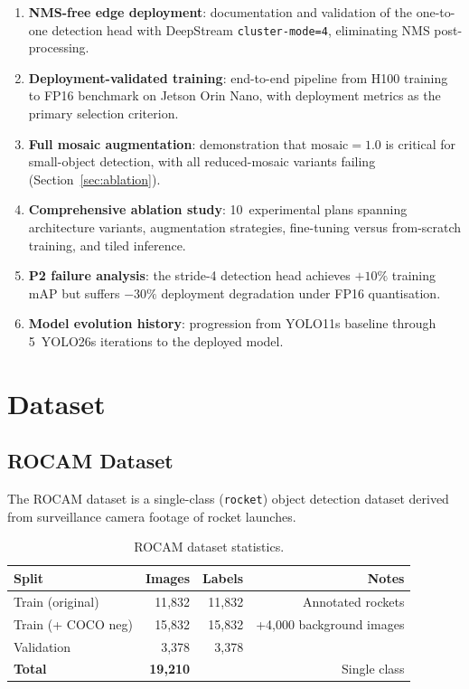 \documentclass[12pt, titlepage]{article}
\begin{document}
\begin{enumerate}[leftmargin=*]
  \item \textbf{NMS-free edge deployment}: documentation and validation
        of the one-to-one detection head with DeepStream
        \texttt{cluster-mode=4}, eliminating NMS post-processing.
  \item \textbf{Deployment-validated training}: end-to-end pipeline from
        H100 training to FP16 benchmark on Jetson Orin Nano, with
        deployment metrics as the primary selection criterion.
  \item \textbf{Full mosaic augmentation}: demonstration that
        $\text{mosaic} = 1.0$ is critical for small-object detection,
        with all reduced-mosaic variants failing (Section~\ref{sec:ablation}).
  \item \textbf{Comprehensive ablation study}: 10~experimental plans
        spanning architecture variants, augmentation strategies,
        fine-tuning versus from-scratch training, and tiled inference.
  \item \textbf{P2 failure analysis}: the stride-4 detection head
        achieves $+10\%$ training mAP but suffers $-30\%$ deployment
        degradation under FP16 quantisation.
  \item \textbf{Model evolution history}: progression from YOLO11s
        baseline through 5~YOLO26s iterations to the deployed model.
\end{enumerate}

\section{Dataset}
\label{sec:dataset}

\subsection{ROCAM Dataset}

The ROCAM dataset is a single-class (\texttt{rocket}) object detection dataset
derived from surveillance camera footage of rocket launches.

\begin{table}[h]
  \centering
  \caption{ROCAM dataset statistics.}
  \label{tab:dataset}
  \begin{tabular}{@{}lrrr@{}}
    \toprule
    \textbf{Split}     & \textbf{Images}   & \textbf{Labels} & \textbf{Notes}             \\
    \midrule
    Train (original)   & 11{,}832          & 11{,}832        & Annotated rockets          \\
    Train (+ COCO neg) & 15{,}832          & 15{,}832        & +4{,}000 background images \\
    Validation         & 3{,}378           & 3{,}378         &                            \\
    \midrule
    \textbf{Total}     & \textbf{19{,}210} &                 & Single class               \\
    \bottomrule
  \end{tabular}
\end{table}
\end{document}
